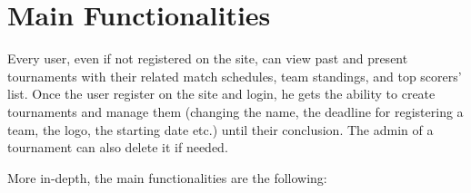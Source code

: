 \section{Main Functionalities}

\noindent Every user, even if not registered on the site, can view past and present tournaments with their related match schedules, team standings,
and top scorers’ list. Once the user register on the site and login, he gets the ability to create tournaments and manage them (changing the name, the deadline for registering a team, the logo, the starting date etc.) until their conclusion. The admin of a tournament can also delete it if needed.

\noindent More in-depth, the main functionalities are the following:

